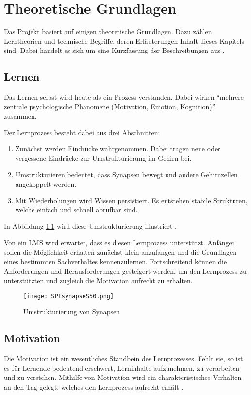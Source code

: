 \chapter{Theoretische Grundlagen}
Das Projekt basiert auf einigen theoretische Grundlagen. Dazu zählen
Lerntheorien und technische Begriffe, deren Erläuterungen Inhalt
dieses Kapitels sind. Dabei handelt es sich um eine Kurzfassung der
Beschreibungen aus \cite{gruben:2012}.

\section{Lernen}
Das Lernen selbst wird heute als ein Prozess verstanden. Dabei wirken "`mehrere
zentrale psychologische Phänomene (Motivation, Emotion,
Kognition)"'\cite{niegemann:2004} zusammen. 

Der Lernprozess besteht dabei aus drei Abschnitten:
\begin{enumerate}
  \item Zunächst werden Eindrücke wahrgenommen. Dabei tragen neue oder
  vergessene Eindrücke zur Umstrukturierung im Gehirn bei.
  \item Umstrukturieren bedeutet, dass Synapsen bewegt und andere Gehirnzellen
  angekoppelt werden.
  \item Mit Wiederholungen wird Wissen persistiert. Es entstehen stabile
  Strukturen, welche einfach und schnell abrufbar sind.
\end{enumerate}
In Abbildung \ref{pic:structSyn} wird diese Umstrukturierung illustriert
\cite{spitzer:2012}.

Von ein LMS wird erwartet, dass es diesen Lernprozess unterstützt. Anfänger
sollen die Möglichkeit erhalten zunächst klein anzufangen und die Grundlagen
eines bestimmten Sachverhaltes kennenzulernen. Fortschreitend können die
Anforderungen und Herausforderungen gesteigert werden, um den Lernprozess zu
unterstützten und zugleich die Motivation aufrecht zu erhalten.

\begin{figure}[H]
\centering
\texttt{[image: SPIsynapseS50.png]}
\caption{Umstrukturierung von Synapsen \footnotemark}\label{pic:structSyn}
\end{figure}

\section{Motivation}\label{ref:basMotivation}
Die Motivation ist ein wesentliches Standbein des Lernprozesses. Fehlt sie, so
ist es für Lernende bedeutend erschwert, Lerninhalte aufzunehmen, zu verarbeiten
und zu verstehen. Mithilfe von Motivation wird ein charakteristisches Verhalten
an den Tag gelegt, welches den Lernprozess aufrecht erhält \cite{jacobs:2010}.

